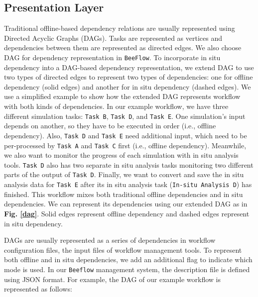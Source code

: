 \subsection{Presentation Layer}
Traditional offline-based dependency relations are usually represented using Directed Acyclic Graphs (DAGs). Tasks are represented as vertices and dependencies between them are represented as directed edges. We also choose DAG for dependency representation in \texttt{BeeFlow}. To incorporate in situ dependency into a DAG-based dependency representation, we extend DAG to use two types of directed edges to represent two types of dependencies: one for offline dependency (solid edges) and another for in situ dependency (dashed edges). We use a simplified example to show how the extended DAG represents workflow with both kinds of dependencies. In our example workflow, we have three different simulation tasks: \texttt{Task B}, \texttt{Task D}, and \texttt{Task E}. One simulation's input depends on another, so they have to be executed in order (i.e., offline dependency). Also, \texttt{Task D} and \texttt{Task E} need additional input, which need to be per-processed by \texttt{Task A} and \texttt{Task C} first (i.e., offline dependency).  Meanwhile, we also want to monitor the progress of each simulation with in situ analysis tools. \texttt{Task D} also has two separate in situ analysis tasks monitoring two different parts of the output of \texttt{Task D}. Finally, we want to convert and save the in situ analysis data for \texttt{Task E} after its in situ analysis task (\texttt{In-situ Analysis D}) has finished. This workflow mixes both traditional offline dependencies and in situ dependencies. We can represent its dependencies using our extended DAG as in \textbf{Fig. \ref{dag}}. Solid edges represent offline dependency and dashed edges represent in situ dependency.

DAGs are usually represented as a series of dependencies in workflow configuration files, the input files of workflow management tools. To represent both offline and in situ dependencies, we add an additional flag to indicate which mode is used. In our \texttt{Beeflow} management system, the description file is defined using JSON format. For example, the DAG of our example workflow is represented as follows:


